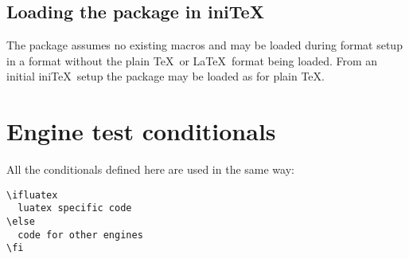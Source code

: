 \documentclass{article}
\begin{document}
\subsection{Loading the package in ini\TeX}
The package assumes no existing macros and may be loaded
during format setup in a format without the plain \TeX\ or \LaTeX\
format being loaded. From an initial ini\TeX\ setup the package may
be loaded as for plain \TeX.

\section{Engine test conditionals}
All the conditionals defined here are used in the same way:
\begin{verbatim}
\ifluatex
  luatex specific code
\else
  code for other engines
\fi
\end{verbatim}
\end{document}
